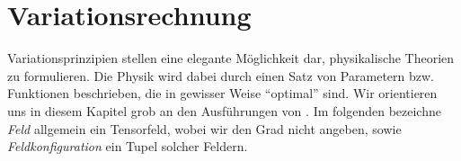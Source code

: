 \begin{beispiel}
 
 \end{beispiel}
\section{Variationsrechnung}
Variationsprinzipien stellen eine elegante Möglichkeit dar, physikalische
Theorien zu formulieren. Die Physik wird dabei durch einen Satz
von Parametern bzw. Funktionen beschrieben, die in gewisser Weise "`optimal"'
sind.
Wir orientieren uns in diesem Kapitel grob an den Ausführungen von 
\cite[s.454 ff]{wald2010general}.
Im folgenden bezeichne \emph{Feld} allgemein ein Tensorfeld, wobei wir den
Grad nicht angeben, sowie \emph{Feldkonfiguration} ein Tupel solcher
Feldern. 

